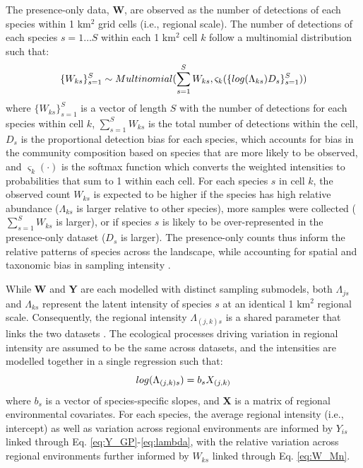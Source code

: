 \documentclass[preprint,final,times,12pt,3p]{elsarticle}
\begin{document}
The presence-only data, \textbf{W}, are observed as the number of detections of each species within 1 km$^2$ grid cells (i.e., regional scale). The number of detections of each species $s=1 \dots S$ within each 1 km$^2$ cell $k$ follow a multinomial distribution such that:
    \begin{equation}
        \{W_{ks}\}_{s=1}^{S} \sim Multinomial(\sum_{s=1}^{S} W_{ks} , \varsigma_k(\{log(\Lambda_{ks})D_s\}_{s=1}^{S})) \\
        \label{eq:W_Mn}
    \end{equation}
where $\{W_{ks}\}_{s=1}^{S}$ is a vector of length $S$ with the number of detections for each species within cell $k$, $\sum_{s=1}^{S} W_{ks}$ is the total number of detections within the cell, $D_s$ is the proportional detection bias for each species, which accounts for bias in the community composition based on species that are more likely to be observed, and $\varsigma_k(\cdot)$ is the softmax function which converts the weighted intensities to probabilities that sum to 1 within each cell. For each species $s$ in cell $k$, the observed count $W_{ks}$ is expected to be higher if the species has high relative abundance ($\Lambda_{ks}$ is larger relative to other species), more samples were collected ($\sum_{s=1}^{S} W_{ks}$ is larger), or if species $s$ is likely to be over-represented in the presence-only dataset ($D_s$ is larger). The presence-only counts thus inform the relative patterns of species across the landscape, while accounting for spatial and taxonomic bias in sampling intensity \citep{Isaac2014}.

While \textbf{W} and \textbf{Y} are each modelled with distinct sampling submodels, both $\Lambda_{js}$ and $\Lambda_{ks}$ represent the latent intensity of species $s$ at an identical 1 km$^2$ regional scale. Consequently, the regional intensity $\Lambda_{(j,k)s}$ is a shared parameter that links the two datasets \citep{Hefley2016,Isaac2019,Miller2019}. The ecological processes driving variation in regional intensity are assumed to be the same across datasets, and the intensities are modelled together in a single regression such that:
    \begin{equation}
        log(\Lambda_{(j,k)s}) = b_s X_{(j,k)} \\
        \label{eq:LAMBDA}
    \end{equation}
where $b_s$ is a vector of species-specific slopes, and \textbf{X} is a matrix of regional environmental covariates. For each species, the average regional intensity (i.e., intercept) as well as variation across regional environments are informed by $Y_{is}$ linked through Eq. \ref{eq:Y_GP}-\ref{eq:lambda}, with the relative variation across regional environments further informed by $W_{ks}$ linked through Eq. \ref{eq:W_Mn}.  
\end{document}
